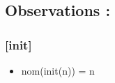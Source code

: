 \documentclass[11pt]{article}
\begin{document}
\subsection{Observations :}
\label{sec-1.5}

\subsubsection{[init]}
\label{sec-1.5.1}

\begin{itemize}

\item nom(init(n)) = n\\
\label{sec-1.5.1.1}

\end{itemize} %
\end{document}
